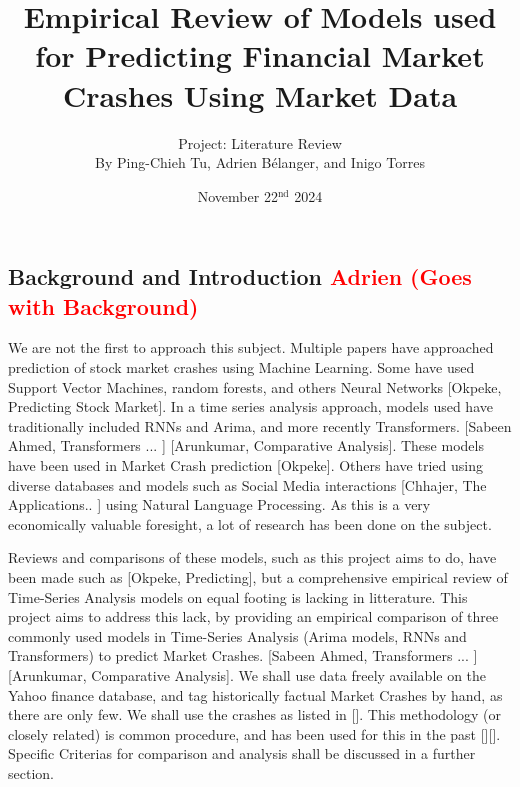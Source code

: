 \documentclass[12pt, letterpaper]{article}
\title{Empirical Review of Models used for Predicting Financial Market Crashes Using Market Data}
\author{\large Project: Literature Review \vspace{0.75em} \\ \normalsize By Ping-Chieh Tu, Adrien Bélanger, and Inigo Torres}
\date{November 22$^{\text{nd}}$ 2024}
\begin{document}
\maketitle 

\justifying %
\begin{comment}
Overall objective to keep in mind:

"In this milestone, the objective is to review the related literature to your proposal. This will better inform your methodology for your project if it involves a new idea, and it is necessary if you are comparing existing methods for a certain domain. It may even lead to a change of proposal, once you learn about existing methods out there. If you are producing a literature survey on a research topic, in this stage, you just provide a "breadth" review, in which you emphasize covering as many related works as possible and providing some preliminary organization without going into much detail."\\

Evaluation Criterias:

- Putting your proposal into context of related literature

- Coverage (are you adequately covering most relevant works)
\end{comment}
\subsection*{Background and Introduction \textcolor{red}{Adrien (Goes with Background)} }
We are not the first to approach this subject. 
Multiple papers have approached prediction of stock market crashes using Machine Learning. 
Some have used Support Vector Machines, random forests, and others Neural Networks [Okpeke, Predicting Stock Market]. 
In a time series analysis approach, models used have traditionally included RNNs and Arima, and more recently Transformers. [Sabeen Ahmed, Transformers ... ] [Arunkumar, Comparative Analysis]. 
These models have been used in Market Crash prediction [Okpeke]. 
Others have tried using diverse databases and models such as Social Media interactions [Chhajer, The Applications.. ] using Natural Language Processing. As this is a very economically valuable foresight, a lot of research has been done on the subject.


Reviews and comparisons of these models, such as this project aims to do, have been made such as [Okpeke, Predicting], but a comprehensive empirical review of Time-Series Analysis models on equal footing is lacking in litterature. 
This project aims to address this lack, by providing an empirical comparison of three commonly used models in Time-Series Analysis (Arima models, RNNs and Transformers) to predict Market Crashes. [Sabeen Ahmed, Transformers ... ] [Arunkumar, Comparative Analysis]. 
We shall use data freely available on the Yahoo finance database, and tag historically factual Market Crashes by hand, as there are only few. We shall use the crashes as listed in []. This methodology (or closely related) is common procedure, and has been used for this in the past [][]. Specific Criterias for comparison and analysis shall be discussed in a further section.
\end{document}
